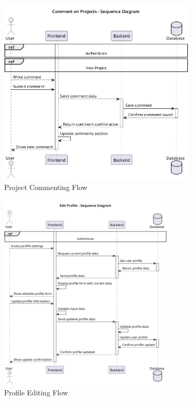 \begin{figure}[H]
\centering
\includegraphics[width=0.85\textwidth]{conception/SprintV/sequence_diagrams/sequence_communityInteraction_6_3_CommentOnProjects.png}
\caption{Project Commenting Flow}
\label{fig:seq_comment_projects}
\end{figure}

\begin{figure}[H]
\centering
\includegraphics[width=0.75\textwidth]{conception/SprintV/sequence_diagrams/sequence_profileManagement_7_1_EditUserProfile.png}
\caption{Profile Editing Flow}
\label{fig:seq_edit_profile}
\end{figure}

